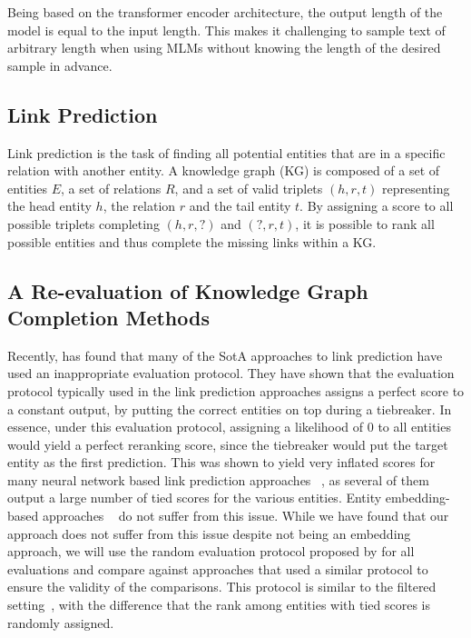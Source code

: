 \documentclass[11pt,a4paper]{article}
\newcommand{\CiteT}[1]{\citet{#1}} \newcommand{\CiteP}[1]{~\citep{#1}} \newcommand{\CodeT}[1]{\texttt{#1}}
\begin{document}
Being based on the transformer encoder architecture, the output length of the model is equal to the input length.
This makes it challenging to sample text of arbitrary length when using MLMs without knowing the length of the desired sample in advance.

\subsection{Link Prediction}


Link prediction is the task of finding all potential entities that are in a specific relation with another entity.
A knowledge graph (KG) is composed of a set of entities $E$, a set of relations $R$, and a set of valid triplets $(h, r, t)$ representing the head entity $h$, the relation $r$ and the tail entity $t$.
By assigning a score to all possible triplets completing $(h, r, ?)$ and $(?, r, t)$, it is possible to rank all possible entities and thus complete the missing links within a KG.


\subsection{A Re-evaluation of Knowledge Graph Completion Methods}


Recently, \CiteT{ReevaluationKB} has found that many of the SotA approaches to link prediction have used an inappropriate evaluation protocol.
They have shown that the evaluation protocol typically used in the link prediction approaches assigns a perfect score to a constant output, by putting the correct entities on top during a tiebreaker.
In essence, under this evaluation protocol, assigning a likelihood of 0 to all entities would yield a perfect reranking score, since the tiebreaker would put the target entity as the first prediction.
This was shown to yield very inflated scores for many neural network based link prediction approaches \CiteP{NN1, NN2, NN3}, as several of them output a large number of tied scores for the various entities.
Entity embedding-based approaches \CiteP{EMB1, EMB2, EMB3} do not suffer from this issue.
While we have found that our approach does not suffer from this issue despite not being an embedding approach, we will use the random evaluation protocol proposed by \CiteT{ReevaluationKB} for all evaluations and compare against approaches that used a similar protocol to ensure the validity of the comparisons.
This protocol is similar to the filtered setting\CiteP{FB15k}, with the difference that the rank among entities with tied scores is randomly assigned.
\end{document}
